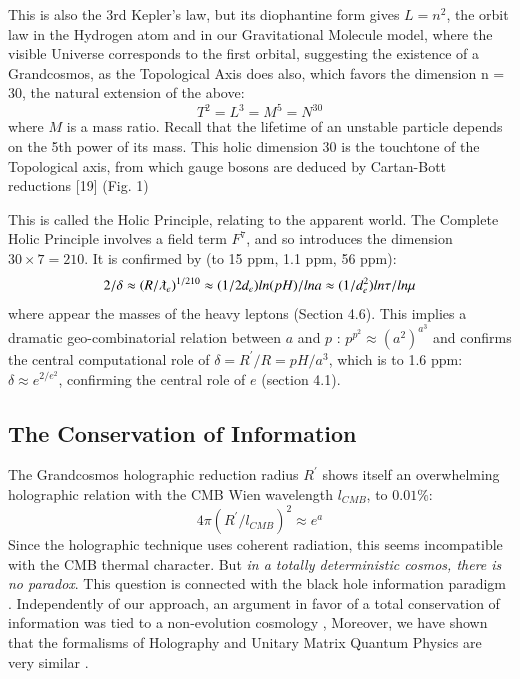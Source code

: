 \documentclass[twoside,draft]{article}
\begin{document}
\begin{sloppypar}
{This is also the 3rd Kepler's law, but its diophantine form gives $L = n^{2}$, the orbit law in the Hydrogen atom and in our
Gravitational Molecule model, where the visible Universe corresponds to the first orbital,
suggesting the existence of a Grandcosmos, as the Topological Axis does also, which favors the
dimension n = 30, the natural extension of the above:
\begin{equation}
T^{2} = L^{3} = M^{5} = N^{30}
\end{equation}
where $M$ is a mass ratio. Recall that the lifetime of an unstable particle depends on the 5th power of its mass. This holic dimension 30 is the touchtone of the Topological axis, from which gauge bosons are deduced by Cartan-Bott reductions [19] (Fig. 1)

This is called the Holic Principle, relating to the apparent world. The Complete Holic
Principle involves a field term $F^{7}$, and so introduces the dimension $30 \times 7 = 210$. It is confirmed by (to 15 ppm, 1.1 ppm, 56 ppm):
$$2/\delta \approx (R/\lambdabar_{e})^{1/210} \approx (1/2d_{e}) ln(pH)/lna \approx (1/d_e^{2})ln\tau/ln\mu$$
where appear the masses of the heavy leptons (Section 4.6). This implies a dramatic geo-combinatorial relation between $a$ and $p$ : $p^{p^{2}} \approx (a^{2})^{a^{3}}$ and confirms the central computational role of $\delta = R^{\prime}/R = pH/a^{3}$, which is to 1.6 ppm:$\delta \approx e^{2/e^2}$, confirming the central role of $e$ (section 4.1).


\subsection{The Conservation of Information}

The Grandcosmos holographic reduction radius $R^{\prime}$ shows itself an overwhelming holographic
relation with the CMB Wien wavelength $l_{CMB}$, to $0.01\%$:
\begin{equation}
4\pi(R^{\prime}/l_{CMB})^{2} \approx e^{a}
\end{equation}
Since the holographic technique uses coherent radiation, this seems incompatible with the CMB
thermal character. But \textit{in a totally deterministic cosmos, there is no paradox}. This question is
connected with the black hole information paradigm \cite{Preskill}. Independently of our approach, an
argument in favor of a total conservation of information was tied to a non-evolution cosmology
\cite{Nikolic}, Moreover, we have shown that the formalisms of Holography and Unitary Matrix Quantum
Physics are very similar \cite{Sanchez1}. 

}
\end{sloppypar}
\end{document}
